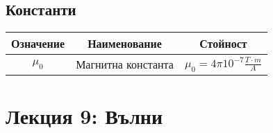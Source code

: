\documentclass[fleqn, 12pt]{article}
\theoremstyle{definition}
\begin{document}
\newpage
\subsection{Константи}

\begin{center}
\begin{tabular}{ |c|c|c|}
\hline
\textbf{Означение} & \textbf{Наименование}&\textbf{Стойност}\\
\hline
$\mu_0$ & Магнитна константа & $\mu_0 = 4\pi10^{-7} \frac{T\cdot m}{A}$ \\
\hline
\end{tabular}
\end{center}


\newpage
\section{Лекция 9: Вълни}
\end{document}
